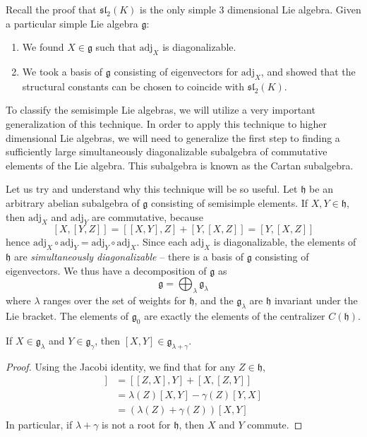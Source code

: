 Recall the proof that $\mathfrak{sl}_2(K)$ is the only simple 3 dimensional Lie algebra. Given a particular simple Lie algebra $\mathfrak{g}$:
%
\begin{enumerate}
    \item We found $X \in \mathfrak{g}$ such that $\text{adj}_X$ is diagonalizable.
    \item We took a basis of $\mathfrak{g}$ consisting of eigenvectors for $\text{adj}_X$, and showed that the structural constants can be chosen to coincide with $\mathfrak{sl}_2(K)$.
\end{enumerate}
%
To classify the semisimple Lie algebras, we will utilize a very important generalization of this technique. In order to apply this technique to higher dimensional Lie algebras, we will need to generalize the first step to finding a sufficiently large simultaneously diagonalizable subalgebra of commutative elements of the Lie algebra. This subalgebra is known as the Cartan subalgebra.

Let us try and understand why this technique will be so useful. Let $\mathfrak{h}$ be an arbitrary abelian subalgebra of $\mathfrak{g}$ consisting of semisimple elements. If $X, Y \in \mathfrak{h}$, then $\text{adj}_X$ and $\text{adj}_Y$ are commutative, because
%
\[ [X,[Y,Z]] = [[X,Y],Z] + [Y,[X,Z]] = [Y,[X,Z]] \]
%
hence $\text{adj}_X \circ \text{adj}_Y = \text{adj}_Y \circ \text{adj}_X$. Since each $\text{adj}_X$ is diagonalizable, the elements of $\mathfrak{h}$ are {\it simultaneously diagonalizable} -- there is a basis of $\mathfrak{g}$ consisting of eigenvectors. We thus have a decomposition of $\mathfrak{g}$ as
%
\[ \mathfrak{g} = \bigoplus_{\lambda} \mathfrak{g}_\lambda \]
%
where $\lambda$ ranges over the set of weights for $\mathfrak{h}$, and the $\mathfrak{g}_\lambda$ are $\mathfrak{h}$ invariant under the Lie bracket. The elements of $\mathfrak{g}_0$ are exactly the elements of the centralizer $C(\mathfrak{h})$.

\begin{theorem}
    If $X \in \mathfrak{g}_\lambda$ and $Y \in \mathfrak{g}_\gamma$, then $[X,Y] \in \mathfrak{g}_{\lambda + \gamma}$.
\end{theorem}
\begin{proof}
    Using the Jacobi identity, we find that for any $Z \in \mathfrak{h}$,
    \begin{align*}
        [Z,[X,Y]] &= [[Z,X],Y] + [X,[Z,Y]]\\
        &= \lambda(Z)[X,Y] - \gamma(Z)[Y,X]\\
        &= (\lambda(Z) + \gamma(Z))[X,Y]
    \end{align*}
    In particular, if $\lambda + \gamma$ is not a root for $\mathfrak{h}$, then $X$ and $Y$ commute.
\end{proof}

